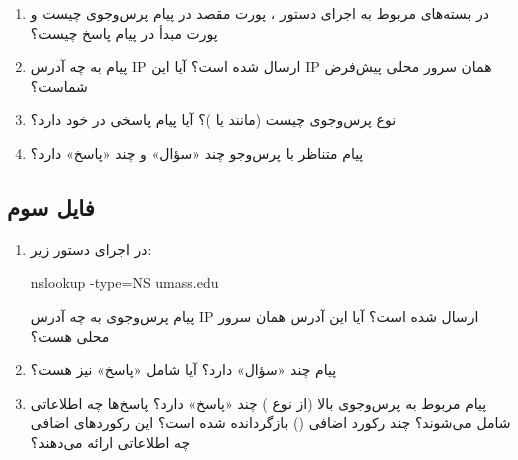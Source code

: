 \begin{enumerate}
	
	\item
	در بسته‌های مربوط به اجرای دستور ،
	پورت مقصد در پیام پرس‌وجوی  چیست و پورت مبدأ در پیام پاسخ چیست؟
	
	\item
	پیام  به چه آدرس IP ارسال شده است؟ 
	آیا این IP همان سرور  محلی پیش‌فرض شماست؟
	
	\item
	نوع پرس‌وجوی  چیست (مانند  یا )؟ 
	آیا پیام  پاسخی در خود دارد؟
	
	\item
	پیام  متناظر با پرس‌وجو چند «سؤال» و چند «پاسخ» دارد؟
	

	
\end{enumerate}

\subsection*{فایل سوم}

\begin{enumerate}
	
		\item
	در اجرای دستور زیر:
	\begin{latin}
		nslookup -type=NS umass.edu
	\end{latin}
	پیام پرس‌وجوی  به چه آدرس IP ارسال شده است؟ 
	آیا این آدرس همان سرور  محلی هست؟
	
	\item
	پیام  چند «سؤال» دارد؟ 
	آیا شامل «پاسخ» نیز هست؟
	
	\item
	پیام  مربوط به پرس‌وجوی بالا (از نوع ) چند «پاسخ» دارد؟
	پاسخ‌ها چه اطلاعاتی شامل می‌شوند؟
	چند رکورد اضافی () بازگردانده شده است؟
	این رکوردهای اضافی چه اطلاعاتی ارائه می‌دهند؟
	
\end{enumerate}
